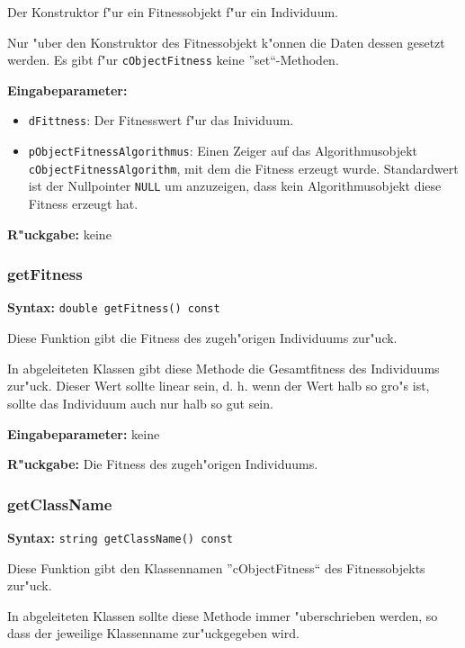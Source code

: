 Der Konstruktor f"ur ein Fitnessobjekt f"ur ein Individuum.

Nur "uber den Konstruktor des Fitnessobjekt k"onnen die Daten dessen gesetzt werden. Es gibt f"ur \verb|cObjectFitness| keine ''set``-Methoden.

\bigskip\noindent
\textbf{Eingabeparameter:}
\begin{itemize}
 \item \verb|dFittness|: Der Fitnesswert f"ur das Inividuum.
 \item \verb|pObjectFitnessAlgorithmus|: Einen Zeiger auf das Algorithmusobjekt \verb|cObjectFitnessAlgorithm|, mit dem die Fitness erzeugt wurde. Standardwert ist der Nullpointer \verb|NULL| um anzuzeigen, dass kein Algorithmusobjekt diese Fitness erzeugt hat.
\end{itemize}

\bigskip\noindent
\textbf{R"uckgabe:} keine


\subsubsection{getFitness}

\textbf{Syntax:} \verb|double getFitness() const|

\bigskip\noindent
Diese Funktion gibt die Fitness des zugeh"origen Individuums zur"uck.

In abgeleiteten Klassen gibt diese Methode die Gesamtfitness des Individuums zur"uck.
Dieser Wert sollte linear sein, d. h. wenn der Wert halb so gro"s ist, sollte das Individuum auch nur halb so gut sein.

\bigskip\noindent
\textbf{Eingabeparameter:} keine

\bigskip\noindent
\textbf{R"uckgabe:} Die Fitness des zugeh"origen Individuums.


\subsubsection{getClassName}

\textbf{Syntax:} \verb|string getClassName() const|

\bigskip\noindent
Diese Funktion gibt den Klassennamen ''cObjectFitness`` des Fitnessobjekts zur"uck.

In abgeleiteten Klassen sollte diese Methode immer "uberschrieben werden, so dass der jeweilige Klassenname zur"uckgegeben wird.

